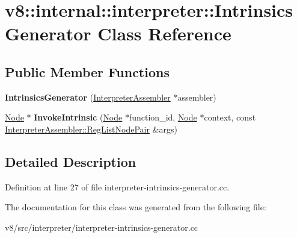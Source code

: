 \hypertarget{classv8_1_1internal_1_1interpreter_1_1IntrinsicsGenerator}{}\section{v8\+:\+:internal\+:\+:interpreter\+:\+:Intrinsics\+Generator Class Reference}
\label{classv8_1_1internal_1_1interpreter_1_1IntrinsicsGenerator}
\subsection*{Public Member Functions}
\begin{DoxyCompactItemize}
\item 
\mbox{\label{classv8_1_1internal_1_1interpreter_1_1IntrinsicsGenerator_a65b9550b33dddbd98736c2a46e56f114}} 
{\bfseries Intrinsics\+Generator} (\mbox{\hyperlink{classv8_1_1internal_1_1interpreter_1_1InterpreterAssembler}{Interpreter\+Assembler}} $\ast$assembler)
\item 
\mbox{\label{classv8_1_1internal_1_1interpreter_1_1IntrinsicsGenerator_aa8794db09f1dbad7791440ca4e1ce591}} 
\mbox{\hyperlink{classv8_1_1internal_1_1compiler_1_1Node}{Node}} $\ast$ {\bfseries Invoke\+Intrinsic} (\mbox{\hyperlink{classv8_1_1internal_1_1compiler_1_1Node}{Node}} $\ast$function\+\_\+id, \mbox{\hyperlink{classv8_1_1internal_1_1compiler_1_1Node}{Node}} $\ast$context, const \mbox{\hyperlink{classv8_1_1internal_1_1interpreter_1_1InterpreterAssembler_1_1RegListNodePair}{Interpreter\+Assembler\+::\+Reg\+List\+Node\+Pair}} \&args)
\end{DoxyCompactItemize}


\subsection{Detailed Description}


Definition at line 27 of file interpreter-\/intrinsics-\/generator.\+cc.



The documentation for this class was generated from the following file\+:\begin{DoxyCompactItemize}
\item 
v8/src/interpreter/interpreter-\/intrinsics-\/generator.\+cc\end{DoxyCompactItemize}
